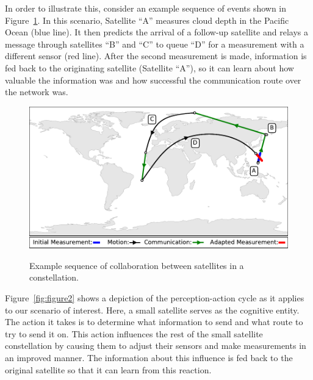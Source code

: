 \documentclass[conference]{IEEEtran}
\begin{document}
In order to illustrate this, consider an example sequence of events shown in
Figure~\ref{fig:figureColab}.  In this scenario, Satellite ``A'' measures
cloud depth in the Pacific Ocean (blue line).  It then predicts the arrival of a
follow-up satellite and relays a message through satellites ``B'' and ``C'' to
queue ``D'' for a measurement with a different sensor (red line).  After the
second measurement is made, information is fed back to the originating satellite
(Satellite ``A''), so it can learn about how valuable the information was and
how successful the communication route over the network was.

\begin{figure}[b!]
  \begin{center}
    \includegraphics[width=0.9\linewidth] {images/collaborate.pdf} \\
  \end{center}
  \caption{Example sequence of collaboration between satellites in a constellation.}
  \label{fig:figureColab}
\end{figure}

Figure~\ref{fig:figure2} shows a depiction of the perception-action cycle as it applies to our scenario of interest.  Here, a small satellite serves as the cognitive entity.  The action it takes is to determine what information to send and what route to try to send it on.  This action influences the rest of the small satellite constellation by causing them to adjust their sensors and make measurements in an improved manner.  The information about this influence is fed back to the original satellite so that it can learn from this reaction.

\end{document}
